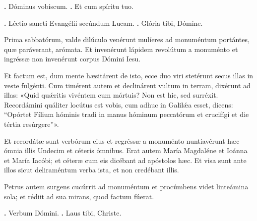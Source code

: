 
\textbf{\Vbar.} Dóminus vobíscum.
\textbf{\Rbar.} Et cum spíritu tuo.

\textbf{\Vbar.} Léctio sancti Evangélii secúndum Lucam.
\textbf{\Rbar.} Glória tibi, Dómine.

Prima sabbatórum, valde dilúculo venérunt mulíeres ad monuméntum portántes, quæ paráverant, arómata. 
Et invenérunt lápidem revolútum a monuménto et ingréssæ non invenérunt corpus Dómini Iesu.

Et factum est, dum mente hæsitárent de isto, ecce duo viri stetérunt secus illas in veste fulgénti. 
Cum timérent autem et declinárent vultum in terram, dixérunt ad illas:
«Quid qu\'{\ae}ritis vivéntem cum mórtuis?
Non est hic, sed surréxit. Recordámini quáliter locútus est vobis, cum adhuc in Galil\'{\ae}a esset, dicens: “Opórtet Fílium hóminis tradi in manus hóminum peccatórum et crucifígi et die tértia resúrgere”».

Et recordátæ sunt verbórum eius et regréssæ a monuménto nuntiavérunt hæc ómnia
illis Undecim et céteris ómnibus.
Erat autem María Magdaléne et Ioánna et María Iacóbi; et céteræ cum eis dicébant ad apóstolos hæc.
Et visa sunt ante illos sicut deliraméntum verba ista, et non credébant illis.

Petrus autem surgens cucúrrit ad monuméntum et procúmbens videt linteámina sola; et rédiit ad sua mirans, quod factum fúerat.

\textbf{\Vbar.} Verbum Dómini.
\textbf{\Rbar.} Laus tibi, Christe.
\par